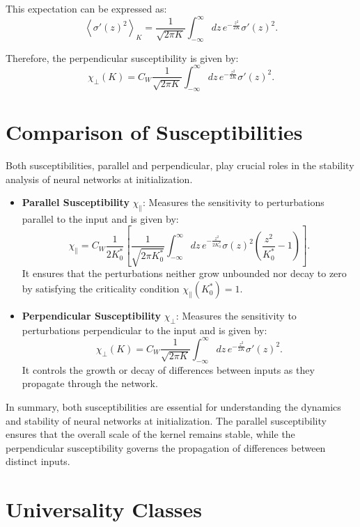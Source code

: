 \documentclass{article}
\begin{document}
This expectation can be expressed as:
\[
\left\langle \sigma'(z)^2 \right\rangle_{K} = \frac{1}{\sqrt{2\pi K}} \int_{-\infty}^{\infty} dz \, e^{-\frac{z^2}{2K}} \sigma'(z)^2.
\]

Therefore, the perpendicular susceptibility is given by:
\[
\chi_{\perp}(K) = C_W \frac{1}{\sqrt{2\pi K}} \int_{-\infty}^{\infty} dz \, e^{-\frac{z^2}{2K}} \sigma'(z)^2.
\]

\section{Comparison of Susceptibilities}

Both susceptibilities, parallel and perpendicular, play crucial roles in the stability analysis of neural networks at initialization.

\begin{itemize}
    \item \textbf{Parallel Susceptibility} $\chi_{\parallel}$: Measures the sensitivity to perturbations parallel to the input and is given by:
    \[
    \chi_{\parallel} = C_W \frac{1}{2K_0^*} \left[ \frac{1}{\sqrt{2\pi K_0^*}} \int_{-\infty}^{\infty} dz \, e^{-\frac{z^2}{2K_0^*}} \sigma(z)^2 \left( \frac{z^2}{K_0^*} - 1 \right) \right].
    \]
    It ensures that the perturbations neither grow unbounded nor decay to zero by satisfying the criticality condition $\chi_{\parallel}(K_0^*) = 1$.

    \item \textbf{Perpendicular Susceptibility} $\chi_{\perp}$: Measures the sensitivity to perturbations perpendicular to the input and is given by:
    \[
    \chi_{\perp}(K) = C_W \frac{1}{\sqrt{2\pi K}} \int_{-\infty}^{\infty} dz \, e^{-\frac{z^2}{2K}} \sigma'(z)^2.
    \]
    It controls the growth or decay of differences between inputs as they propagate through the network.
\end{itemize}

In summary, both susceptibilities are essential for understanding the dynamics and stability of neural networks at initialization. The parallel susceptibility ensures that the overall scale of the kernel remains stable, while the perpendicular susceptibility governs the propagation of differences between distinct inputs.

\section{Universality Classes}
\end{document}
